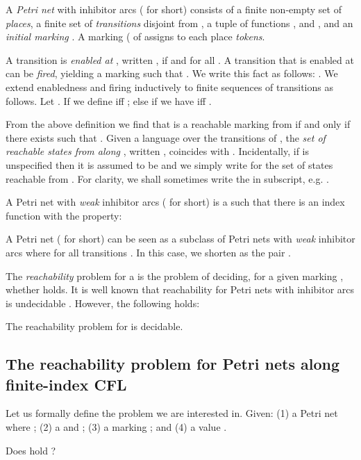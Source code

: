 \documentclass{fsttcs}
\begin{document}
A {\em Petri net} with inhibitor arcs ( for short)
 consists of a finite non-empty set 
of \emph{places}, a finite set  of \emph{transitions} disjoint from , a
tuple  of functions ,  and , and an \emph{initial
marking} .  
A marking  ( of  assigns to each place
  \emph{tokens}.

A transition  is \emph{enabled at} , written , if
 and   for all .  A transition  that is enabled at  can be 
\emph{fired}, yielding a marking  such that . We write this fact as follows: .
We extend enabledness and firing inductively to
finite sequences of transitions as follows. 
Let .
If  we define  if{}f 
; else if  we
have  if{}f .  

From the above definition we find that  is a reachable  marking from
 if and only if there exists  such that .
Given a language  over the transitions of , the \emph{set of
reachable states from  along }, written ,
coincides with .
Incidentally, if  is unspecified then it is assumed to be  and we
simply write  for the set of states reachable from
. For clarity, we shall sometimes write the  in subscript,
e.g. .

A Petri net with {\em weak} inhibitor arcs ( for short)  is a   such that there is an index function  with the property: 

A Petri net ( for short) can be seen as a subclass of Petri nets with {\em weak} inhibitor arcs where  for all transitions . In this case, we shorten  as the pair .


The {\em reachability} problem for a   is the problem of deciding, for a given marking  , whether  holds. It is well known that reachability  for Petri nets with inhibitor arcs is  undecidable \cite{hack76}. However, the following holds:

\begin{theorem}{\cite{Reinhardt}}
	The reachability problem for  is decidable.
	\label{thm:reinhardt}
\end{theorem}

\subsection{The reachability problem for Petri nets along finite-index CFL}

Let us formally define the problem we are interested in.  Given: (1) a Petri net  where ; 
	(2) a   and ; (3) a marking ;
	and (4) a value .

\noindent
\hspace{0pt}Does 
hold ?\hfill\vspace{0pt}
\end{document}
